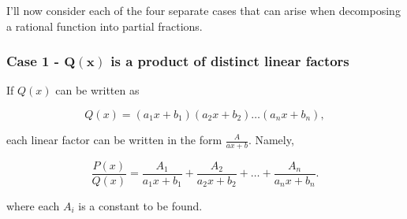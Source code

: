 \documentclass{article}
\begin{document}
  I'll now consider each of the four separate cases that can arise when decomposing a rational function into partial fractions.


  \subsubsection*{Case 1 - \(\mathbf{Q(x)}\) is a product of distinct linear factors}

  If \(Q(x)\) can be written as

  \[
    Q(x) = (a_1x + b_1)(a_2x + b_2) \ldots (a_nx + b_n),
  \]

  each linear factor can be written in the form \(\frac{A}{ax+b}\). Namely,

  \[
    \frac{P(x)}{Q(x)} = \frac{A_1}{a_1x + b_1} + \frac{A_2}{a_2x + b_2} + \ldots + \frac{A_n}{a_nx + b_n}.
  \]

  where each \(A_i\) is a constant to be found.
\end{document}
